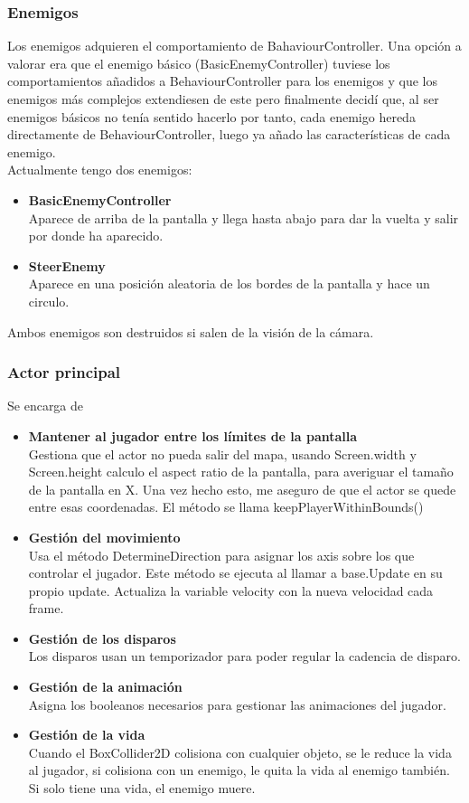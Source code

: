 \documentclass[titlepage, 4apaper]{article}
\begin{document}
\subsubsection{Enemigos}
Los enemigos adquieren el comportamiento de BahaviourController. Una opción a valorar era que el enemigo básico (BasicEnemyController) tuviese los comportamientos añadidos a BehaviourController para los enemigos y que los enemigos más complejos extendiesen de este pero finalmente decidí que, al ser enemigos básicos no tenía sentido hacerlo por tanto, cada enemigo hereda directamente de BehaviourController, luego ya añado las características de cada enemigo.\\Actualmente tengo dos enemigos:
\begin{itemize}
	\item \textbf{BasicEnemyController}\\Aparece de arriba de la pantalla y llega hasta abajo para dar la vuelta y salir por donde ha aparecido.
	\item \textbf{SteerEnemy}\\Aparece en una posición aleatoria de los bordes de la pantalla y hace un circulo.
\end{itemize}
Ambos enemigos son destruidos si salen de la visión de la cámara.
\subsubsection{Actor principal}
Se encarga de  
\begin{itemize}
	\item \textbf{Mantener al jugador entre los límites de la pantalla}\\Gestiona que el actor no pueda salir del mapa, usando Screen.width y Screen.height calculo el aspect ratio de la pantalla, para averiguar el tamaño de la pantalla en X. Una vez hecho esto, me aseguro de que el actor se quede entre esas coordenadas. El método se llama keepPlayerWithinBounds()
	\item \textbf{Gestión del movimiento}\\Usa el método DetermineDirection para asignar los axis sobre los que controlar el jugador. Este método se ejecuta al llamar a base.Update en su propio update. Actualiza la variable velocity con la nueva velocidad cada frame.
	\item \textbf{Gestión de los disparos}\\Los disparos usan un temporizador para poder regular la cadencia de disparo.
	\item \textbf{Gestión de la animación}\\Asigna los booleanos necesarios para gestionar las animaciones del jugador.
	\item \textbf{Gestión de la vida}\\Cuando el BoxCollider2D colisiona con cualquier objeto, se le reduce la vida al jugador, si colisiona con un enemigo, le quita la vida al enemigo también. Si solo tiene una vida, el enemigo muere.
\end{itemize}
\end{document}
